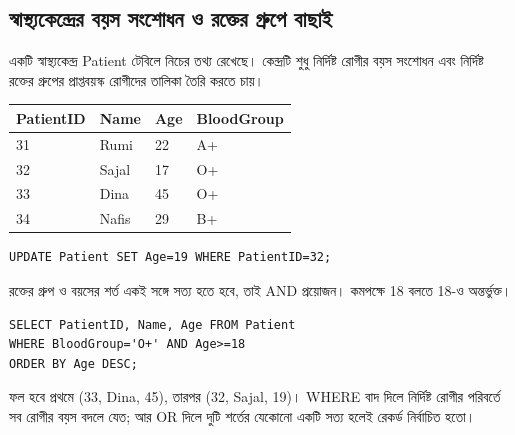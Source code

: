 \subsection{স্বাস্থ্যকেন্দ্রের বয়স সংশোধন ও রক্তের গ্রুপে বাছাই}
একটি স্বাস্থ্যকেন্দ্র Patient টেবিলে নিচের তথ্য রেখেছে। কেন্দ্রটি শুধু নির্দিষ্ট রোগীর বয়স সংশোধন এবং নির্দিষ্ট রক্তের গ্রুপের প্রাপ্তবয়স্ক রোগীদের তালিকা তৈরি করতে চায়।
\begin{flushleft}\small
\begin{tabular}{|l|l|l|l|}\hline
PatientID & Name & Age & BloodGroup\\\hline
31 & Rumi & 22 & A+\\\hline
32 & Sajal & 17 & O+\\\hline
33 & Dina & 45 & O+\\\hline
34 & Nafis & 29 & B+\\\hline
\end{tabular}
\end{flushleft}
\begin{verbatim}
UPDATE Patient SET Age=19 WHERE PatientID=32;
\end{verbatim}
রক্তের গ্রুপ ও বয়সের শর্ত একই সঙ্গে সত্য হতে হবে, তাই AND প্রয়োজন। কমপক্ষে 18 বলতে 18-ও অন্তর্ভুক্ত।
\begin{verbatim}
SELECT PatientID, Name, Age FROM Patient
WHERE BloodGroup='O+' AND Age>=18
ORDER BY Age DESC;
\end{verbatim}
ফল হবে প্রথমে (33, Dina, 45), তারপর (32, Sajal, 19)। WHERE বাদ দিলে নির্দিষ্ট রোগীর পরিবর্তে সব রোগীর বয়স বদলে যেত; আর OR দিলে দুটি শর্তের যেকোনো একটি সত্য হলেই রেকর্ড নির্বাচিত হতো।

